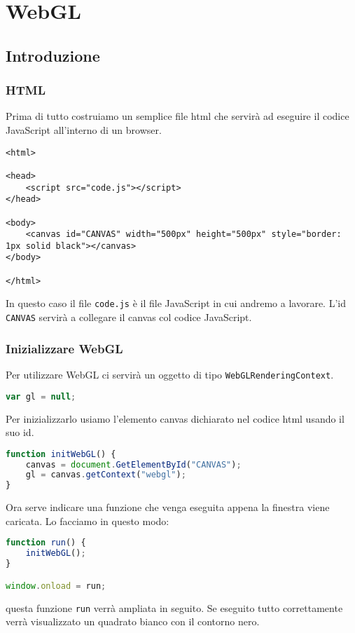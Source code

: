 
\chapter{WebGL}
\section{Introduzione}
\subsection{HTML}
Prima di tutto costruiamo un semplice file html che servir\`a ad eseguire il codice JavaScript
all'interno di un browser.
\begin{lstlisting}[language=html5]
<html>

<head>
	<script src="code.js"></script>
</head>

<body>
	<canvas id="CANVAS" width="500px" height="500px" style="border: 1px solid black"></canvas>
</body>

</html>
\end{lstlisting}
In questo caso il file \verb|code.js| \`e il file JavaScript in cui andremo a lavorare.
L'id \verb|CANVAS| servir\`a a collegare il canvas col codice JavaScript.

\subsection{Inizializzare WebGL}
Per utilizzare WebGL ci servir\`a un oggetto di tipo \verb|WebGLRenderingContext|.
\begin{lstlisting}[language=javascript]
var gl = null;
\end{lstlisting}
Per inizializzarlo usiamo l'elemento canvas dichiarato nel codice html usando il suo id.
\begin{lstlisting}[language=javascript, firstnumber=2]
function initWebGL() {
	canvas = document.GetElementById("CANVAS");
	gl = canvas.getContext("webgl");
}
\end{lstlisting}
Ora serve indicare una funzione che venga eseguita appena la finestra viene caricata. Lo
facciamo in questo modo:
\begin{lstlisting}[language=javascript, firstnumber=6]
function run() {
	initWebGL();
}

window.onload = run;
\end{lstlisting}
questa funzione \verb|run| verr\`a ampliata in seguito.
Se eseguito tutto correttamente verr\`a visualizzato un quadrato bianco con il contorno nero.

